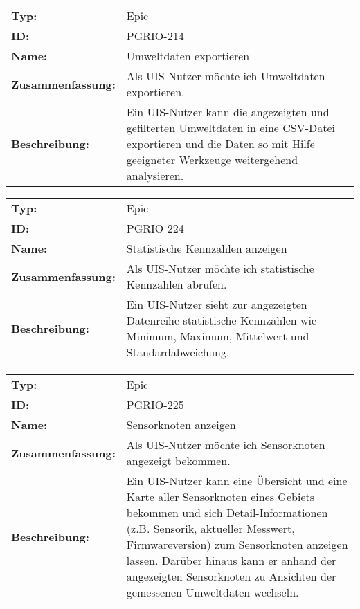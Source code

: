 		\begin{flushleft} 
\begin{tabular}{@{}lp{100mm}} 
\textbf{Typ:} & Epic \\ 
\textbf{ID:} & PGRIO-214 \\ 
\textbf{Name:} & Umweltdaten exportieren \\ 
\textbf{Zusammenfassung:} & Als UIS-Nutzer möchte ich Umweltdaten exportieren. \\ 
\textbf{Beschreibung:} & Ein UIS-Nutzer kann die angezeigten und gefilterten Umweltdaten in eine CSV-Datei exportieren und die Daten so mit Hilfe geeigneter Werkzeuge weitergehend analysieren. \\ 
\end{tabular} 
\end{flushleft} 

		\begin{flushleft} 
\begin{tabular}{@{}lp{100mm}} 
\textbf{Typ:} & Epic \\ 
\textbf{ID:} & PGRIO-224 \\ 
\textbf{Name:} & Statistische Kennzahlen anzeigen \\ 
\textbf{Zusammenfassung:} & Als UIS-Nutzer möchte ich statistische Kennzahlen abrufen. \\ 
\textbf{Beschreibung:} & Ein UIS-Nutzer sieht zur angezeigten Datenreihe statistische Kennzahlen wie Minimum, Maximum, Mittelwert und Standardabweichung. \\ 
\end{tabular} 
\end{flushleft} 

		\begin{flushleft} 
\begin{tabular}{@{}lp{100mm}} 
\textbf{Typ:} & Epic \\ 
\textbf{ID:} & PGRIO-225 \\ 
\textbf{Name:} & Sensorknoten anzeigen \\ 
\textbf{Zusammenfassung:} & Als UIS-Nutzer möchte ich Sensorknoten angezeigt bekommen. \\ 
\textbf{Beschreibung:} & Ein UIS-Nutzer kann eine Übersicht und eine Karte aller Sensorknoten eines Gebiets bekommen und sich Detail-Informationen (z.B. Sensorik, aktueller Messwert, Firmwareversion) zum Sensorknoten anzeigen lassen. Darüber hinaus kann er anhand der angezeigten Sensorknoten zu Ansichten der gemessenen Umweltdaten wechseln. \\ 
\end{tabular} 
\end{flushleft} 

